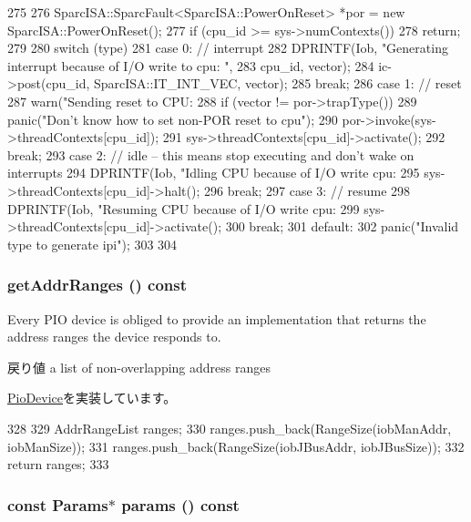 \begin{DoxyCode}
275 {
276     SparcISA::SparcFault<SparcISA::PowerOnReset> *por = new 
      SparcISA::PowerOnReset();
277     if (cpu_id >= sys->numContexts())
278         return;
279 
280     switch (type) {
281       case 0: // interrupt
282         DPRINTF(Iob, "Generating interrupt because of I/O write to cpu: %
      \n",
283                 cpu_id, vector);
284         ic->post(cpu_id, SparcISA::IT_INT_VEC, vector);
285         break;
286       case 1: // reset
287         warn("Sending reset to CPU: %
288         if (vector != por->trapType())
289             panic("Don't know how to set non-POR reset to cpu\n");
290         por->invoke(sys->threadContexts[cpu_id]);
291         sys->threadContexts[cpu_id]->activate();
292         break;
293       case 2: // idle -- this means stop executing and don't wake on interrupts
294         DPRINTF(Iob, "Idling CPU because of I/O write cpu: %
295         sys->threadContexts[cpu_id]->halt();
296         break;
297       case 3: // resume
298         DPRINTF(Iob, "Resuming CPU because of I/O write cpu: %
299         sys->threadContexts[cpu_id]->activate();
300         break;
301       default:
302         panic("Invalid type to generate ipi\n");
303     }
304 }
\end{DoxyCode}
\hypertarget{classIob_a36cf113d5e5e091ebddb32306c098fae}{
\subsubsection[{getAddrRanges}]{ getAddrRanges () const}}
\label{classIob_a36cf113d5e5e091ebddb32306c098fae}
Every PIO device is obliged to provide an implementation that returns the address ranges the device responds to.

\begin{DoxyReturn}{戻り値}
a list of non-\/overlapping address ranges 
\end{DoxyReturn}


\hyperlink{classPioDevice_a6e967f8921e80748eb2be35b6b481a7e}{PioDevice}を実装しています。


\begin{DoxyCode}
328 {
329     AddrRangeList ranges;
330     ranges.push_back(RangeSize(iobManAddr, iobManSize));
331     ranges.push_back(RangeSize(iobJBusAddr, iobJBusSize));
332     return ranges;
333 }
\end{DoxyCode}
\hypertarget{classIob_acd3c3feb78ae7a8f88fe0f110a718dff}{
\subsubsection[{params}]{\setlength{\rightskip}{0pt plus 5cm}const {\bf Params}$\ast$ params () const}}
\label{classIob_acd3c3feb78ae7a8f88fe0f110a718dff}


